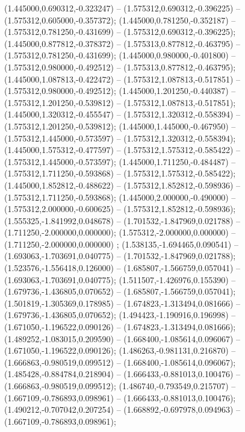  (1.445000,0.690312,-0.323247) -- (1.575312,0.690312,-0.396225) -- (1.575312,0.605000,-0.357372);
 (1.445000,0.781250,-0.352187) -- (1.575312,0.781250,-0.431699) -- (1.575312,0.690312,-0.396225);
 (1.445000,0.877812,-0.378372) -- (1.575313,0.877812,-0.463795) -- (1.575312,0.781250,-0.431699);
 (1.445000,0.980000,-0.401800) -- (1.575312,0.980000,-0.492512) -- (1.575313,0.877812,-0.463795);
 (1.445000,1.087813,-0.422472) -- (1.575312,1.087813,-0.517851) -- (1.575312,0.980000,-0.492512);
 (1.445000,1.201250,-0.440387) -- (1.575312,1.201250,-0.539812) -- (1.575312,1.087813,-0.517851);
 (1.445000,1.320312,-0.455547) -- (1.575312,1.320312,-0.558394) -- (1.575312,1.201250,-0.539812);
 (1.445000,1.445000,-0.467950) -- (1.575312,1.445000,-0.573597) -- (1.575312,1.320312,-0.558394);
 (1.445000,1.575312,-0.477597) -- (1.575312,1.575312,-0.585422) -- (1.575312,1.445000,-0.573597);
 (1.445000,1.711250,-0.484487) -- (1.575312,1.711250,-0.593868) -- (1.575312,1.575312,-0.585422);
 (1.445000,1.852812,-0.488622) -- (1.575312,1.852812,-0.598936) -- (1.575312,1.711250,-0.593868);
 (1.445000,2.000000,-0.490000) -- (1.575312,2.000000,-0.600625) -- (1.575312,1.852812,-0.598936);
 (1.555325,-1.841992,0.048678) -- (1.701532,-1.847969,0.021788) -- (1.711250,-2.000000,0.000000);
 (1.575312,-2.000000,0.000000) -- (1.711250,-2.000000,0.000000) ;
 (1.538135,-1.694465,0.090541) -- (1.693063,-1.703691,0.040775) -- (1.701532,-1.847969,0.021788);
 (1.523576,-1.556418,0.126000) -- (1.685807,-1.566759,0.057041) -- (1.693063,-1.703691,0.040775);
 (1.511507,-1.426976,0.155390) -- (1.679736,-1.436805,0.070652) -- (1.685807,-1.566759,0.057041);
 (1.501819,-1.305369,0.178985) -- (1.674823,-1.313494,0.081666) -- (1.679736,-1.436805,0.070652);
 (1.494423,-1.190916,0.196998) -- (1.671050,-1.196522,0.090126) -- (1.674823,-1.313494,0.081666);
 (1.489252,-1.083015,0.209590) -- (1.668400,-1.085614,0.096067) -- (1.671050,-1.196522,0.090126);
 (1.486263,-0.981131,0.216870) -- (1.666863,-0.980519,0.099512) -- (1.668400,-1.085614,0.096067);
 (1.485428,-0.884784,0.218904) -- (1.666433,-0.881013,0.100476) -- (1.666863,-0.980519,0.099512);
 (1.486740,-0.793549,0.215707) -- (1.667109,-0.786893,0.098961) -- (1.666433,-0.881013,0.100476);
 (1.490212,-0.707042,0.207254) -- (1.668892,-0.697978,0.094963) -- (1.667109,-0.786893,0.098961);
